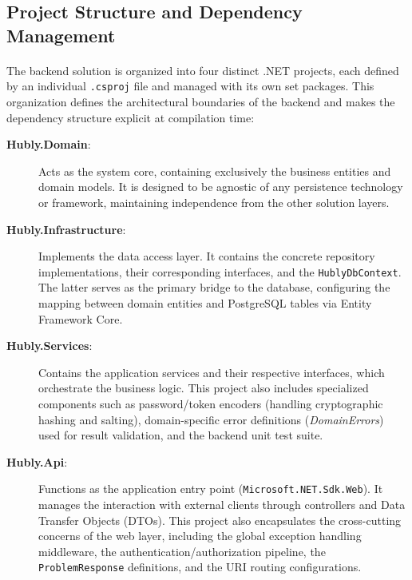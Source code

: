 \subsection{Project Structure and Dependency Management} \label{subsec:project-structure}

\paragraph{} The backend solution is organized into four distinct .NET projects, each defined by an individual \texttt{.csproj} file and managed with its own set packages. This organization defines the architectural boundaries of the backend and makes the dependency structure explicit at compilation time:

\begin{description}
    \item[\textbf{Hubly.Domain}:] Acts as the system core, containing exclusively the business entities and domain models. It is designed to be agnostic of any persistence technology or framework, maintaining independence from the other solution layers.

    \item[\textbf{Hubly.Infrastructure}:] Implements the data access layer. It contains the concrete repository implementations, their corresponding interfaces, and the \texttt{HublyDbContext}. The latter serves as the primary bridge to the database, configuring the mapping between domain entities and PostgreSQL tables via Entity Framework Core.

    \item[\textbf{Hubly.Services}:] Contains the application services and their respective interfaces, which orchestrate the business logic. This project also includes specialized components such as password/token encoders (handling cryptographic hashing and salting), domain-specific error definitions (\textit{DomainErrors}) used for result validation, and the backend unit test suite.

    \item[\textbf{Hubly.Api}:] Functions as the application entry point (\texttt{Microsoft.NET.Sdk.Web}). It manages the interaction with external clients through controllers and Data Transfer Objects (DTOs). This project also encapsulates the cross-cutting concerns of the web layer, including the global exception handling middleware, the authentication/authorization pipeline, the \texttt{ProblemResponse} definitions, and the URI routing configurations.
\end{description}

